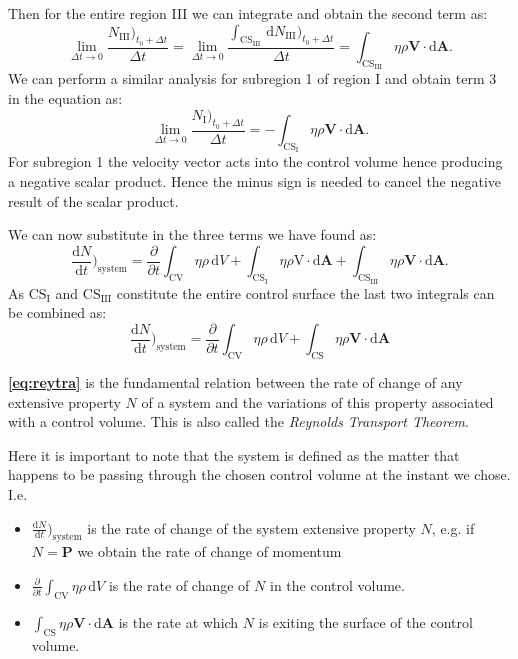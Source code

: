 Then for the entire region III we can integrate and obtain the second term as:
\[ 
\lim_{\Delta t \to 0} \frac{N_{\mathrm{III}})_{t_0 + \Delta t}}{\Delta t} = \lim_{\Delta t \to 0} \frac{\int_{\mathrm{CS}_{\mathrm{III}}} \, \mathrm{d}N_{\mathrm{III}})_{t_0 + \Delta t} }{\Delta t} = \int_{\mathrm{CS}_{\mathrm{III}}} \eta \rho \textbf{V} \cdot \mathrm{d}\textbf{A}
.\]
We can perform a similar analysis for subregion 1 of region I and obtain term 3 in the equation as:
\[ 
\lim_{\Delta t \to 0} \frac{N_{\mathrm{I}} )_{t_0 + \Delta t}}{\Delta t} = - \int_{\mathrm{CS}_{\mathrm{I}}} \eta \rho \textbf{V} \cdot \mathrm{d} \textbf{A}
.\]
For subregion 1 the velocity vector acts into the control volume hence producing a negative scalar product. Hence the minus sign is needed to cancel the negative result of the scalar product.

We can now substitute in the three terms we have found as:
\[ 
\frac{\mathrm{d}N}{\mathrm{d}t} \bigg)_{\mathrm{system}} = \frac{\partial}{\partial t} \int_{\mathrm{CV}} \eta \rho \, \mathrm{d}V + \int_{\mathrm{CS}_{\mathrm{I}}} \eta \rho \mathrm{V} \cdot \mathrm{d} \textbf{A} + \int_{\mathrm{CS}_{\mathrm{III}}} \eta \rho \textbf{V} \cdot \mathrm{d} \textbf{A}
.\]
As $\mathrm{CS}_{\mathrm{I}}$ and $\mathrm{CS}_{\mathrm{III}}$ constitute the entire control surface the last two integrals can be combined as:
\begin{equation}\label{eq:reytra}
  \frac{\mathrm{d}N}{\mathrm{d}t} \bigg)_{\mathrm{system}} = \frac{\partial}{\partial t} \int_{\mathrm{CV}} \eta \rho \, \mathrm{d}V + \int_{\mathrm{CS}} \eta \rho \textbf{V} \cdot \mathrm{d} \textbf{A}
\end{equation}

\textbf{\autoref{eq:reytra}} is the fundamental relation between the rate of change of any extensive property $N$ of a system and the variations of this property associated with a control volume. This is also called the \textit{Reynolds Transport Theorem}. 

Here it is important to note that the system is defined as the matter that happens to be passing through the chosen control volume at the instant we chose. I.e.
\begin{itemize}
  \item $\frac{\mathrm{d}N}{\mathrm{d}t} \bigg)_{\mathrm{system}}$ is the rate of change of the system extensive property $N$, e.g. if $N = \textbf{P}$ we obtain the rate of change of momentum
  \item $\frac{\partial}{\partial t} \int_{\mathrm{CV}} \eta \rho \, \mathrm{d}V$ is the rate of change of $N$ in the control volume. 
  \item $\int_{\mathrm{CS}} \eta \rho \textbf{V} \cdot \mathrm{d} \textbf{A}$ is the rate at which $N$ is exiting the surface of the control volume. 
\end{itemize}

